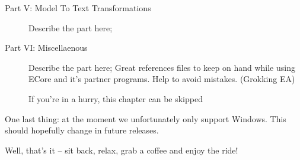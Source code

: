 \begin{description}
\item[Part V: Model To Text Transformations] Describe the part here;

\item[Part VI: Miscellaenous] Describe the part here; Great references files to keep on hand while using ECore and it's partner programs. Help to avoid mistakes. (Grokking EA)

If you're in a hurry, this chapter can be skipped

\end{description}

One last thing: at the moment we unfortunately only support Windows. This should hopefully change in future releases.

Well, that's it -- sit back, relax, grab a coffee and enjoy the ride!


